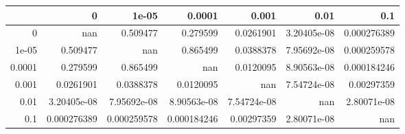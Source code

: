 \begin{tabular}{rrrrrrr}
\toprule
        &             0 &         1e-05 &        0.0001 &         0.001 &          0.01 &           0.1 \\
\midrule
 0      & nan           &   0.509477    &   0.279599    &   0.0261901   &   3.20405e-08 &   0.000276389 \\
 1e-05  &   0.509477    & nan           &   0.865499    &   0.0388378   &   7.95692e-08 &   0.000259578 \\
 0.0001 &   0.279599    &   0.865499    & nan           &   0.0120095   &   8.90563e-08 &   0.000184246 \\
 0.001  &   0.0261901   &   0.0388378   &   0.0120095   & nan           &   7.54724e-08 &   0.00297359  \\
 0.01   &   3.20405e-08 &   7.95692e-08 &   8.90563e-08 &   7.54724e-08 & nan           &   2.80071e-08 \\
 0.1    &   0.000276389 &   0.000259578 &   0.000184246 &   0.00297359  &   2.80071e-08 & nan           \\
\bottomrule
\end{tabular}